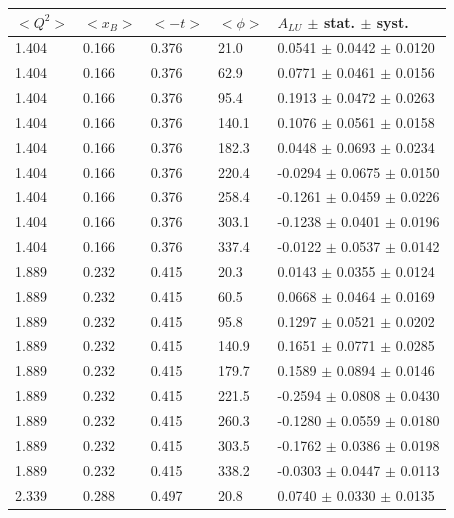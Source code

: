 \documentclass[aps,prc,preprint,superscriptaddress]{revtex4}
\begin{document}
\begin{table}[!h]
   \begin{center}
      \begin{tabular}{||l|l|l|l|l||}
         \hline
 $<Q^{2}>$ & $<x_{B}>$ & $<-t>$ & $<\phi>$ & $A_{LU}$ $\pm$ stat. $\pm$ syst.\\
 \hline 
  1.404 & 0.166 & 0.376  &   21.0 &   0.0541 $\pm$  0.0442  $\pm$ 0.0120 \\
  1.404 & 0.166 & 0.376  &   62.9 &   0.0771 $\pm$  0.0461  $\pm$ 0.0156 \\
  1.404 & 0.166 & 0.376  &   95.4 &   0.1913 $\pm$  0.0472  $\pm$ 0.0263 \\
  1.404 & 0.166 & 0.376  &  140.1 &   0.1076 $\pm$  0.0561  $\pm$ 0.0158 \\
  1.404 & 0.166 & 0.376  &  182.3 &   0.0448 $\pm$  0.0693  $\pm$ 0.0234 \\
  1.404 & 0.166 & 0.376  &  220.4 &  -0.0294 $\pm$  0.0675  $\pm$ 0.0150 \\
  1.404 & 0.166 & 0.376  &  258.4 &  -0.1261 $\pm$  0.0459  $\pm$ 0.0226 \\
  1.404 & 0.166 & 0.376  &  303.1 &  -0.1238 $\pm$  0.0401  $\pm$ 0.0196 \\
  1.404 & 0.166 & 0.376  &  337.4 &  -0.0122 $\pm$  0.0537  $\pm$ 0.0142 \\
  \hline                                                              
  1.889 & 0.232 & 0.415  &   20.3 &   0.0143 $\pm$  0.0355  $\pm$ 0.0124 \\
  1.889 & 0.232 & 0.415  &   60.5 &   0.0668 $\pm$  0.0464  $\pm$ 0.0169 \\
  1.889 & 0.232 & 0.415  &   95.8 &   0.1297 $\pm$  0.0521  $\pm$ 0.0202 \\
  1.889 & 0.232 & 0.415  &  140.9 &   0.1651 $\pm$  0.0771  $\pm$ 0.0285 \\
  1.889 & 0.232 & 0.415  &  179.7 &   0.1589 $\pm$  0.0894  $\pm$ 0.0146 \\
  1.889 & 0.232 & 0.415  &  221.5 &  -0.2594 $\pm$  0.0808  $\pm$ 0.0430 \\
  1.889 & 0.232 & 0.415  &  260.3 &  -0.1280 $\pm$  0.0559  $\pm$ 0.0180 \\
  1.889 & 0.232 & 0.415  &  303.5 &  -0.1762 $\pm$  0.0386  $\pm$ 0.0198 \\
  1.889 & 0.232 & 0.415  &  338.2 &  -0.0303 $\pm$  0.0447  $\pm$ 0.0113 \\
  \hline                                                              
  2.339 & 0.288 & 0.497  &  20.8  &  0.0740  $\pm$  0.0330  $\pm$ 0.0135 \\

\end{tabular}
\end{center}
\end{table}
\end{document}
